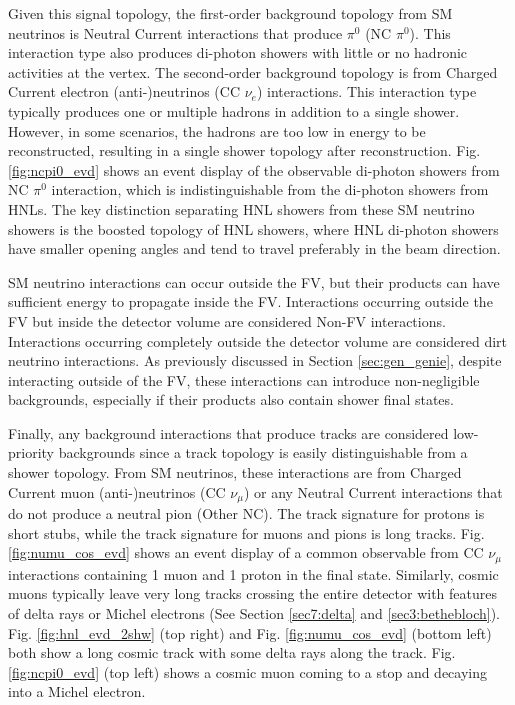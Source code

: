 Given this signal topology, the first-order background topology from SM neutrinos is Neutral Current interactions that produce $\pi^0$ (NC $\pi^0$).
This interaction type also produces di-photon showers with little or no hadronic activities at the vertex.
The second-order background topology is from Charged Current electron (anti-)neutrinos (CC $\nu_e$) interactions.
This interaction type typically produces one or multiple hadrons in addition to a single shower.
However, in some scenarios, the hadrons are too low in energy to be reconstructed, resulting in a single shower topology after reconstruction.
Fig. \ref{fig:ncpi0_evd} shows an event display of the observable di-photon showers from NC $\pi^0$ interaction, which is indistinguishable from the di-photon showers from HNLs.
The key distinction separating HNL showers from these SM neutrino showers is the boosted topology of HNL showers, where HNL di-photon showers have smaller opening angles and tend to travel preferably in the beam direction. 

SM neutrino interactions can occur outside the FV, but their products can have sufficient energy to propagate inside the FV.
Interactions occurring outside the FV but inside the detector volume are considered Non-FV interactions.
Interactions occurring completely outside the detector volume are considered dirt neutrino interactions.
As previously discussed in Section \ref{sec:gen_genie}, despite interacting outside of the FV, these interactions can introduce non-negligible backgrounds, especially if their products also contain shower final states. 

Finally, any background interactions that produce tracks are considered low-priority backgrounds since a track topology is easily distinguishable from a shower topology.
From SM neutrinos, these interactions are from Charged Current muon (anti-)neutrinos (CC $\nu_\mu$) or any Neutral Current interactions that do not produce a neutral pion (Other NC).
The track signature for protons is short stubs, while the track signature for muons and pions is long tracks.
Fig. \ref{fig:numu_cos_evd} shows an event display of a common observable from CC $\nu_\mu$ interactions containing 1 muon and 1 proton in the final state.
Similarly, cosmic muons typically leave very long tracks crossing the entire detector with features of delta rays or Michel electrons (See Section \ref{sec7:delta} and \ref{sec3:bethebloch}).
Fig. \ref{fig:hnl_evd_2shw} (top right) and Fig. \ref{fig:numu_cos_evd} (bottom left) both show a long cosmic track with some delta rays along the track.
Fig. \ref{fig:ncpi0_evd} (top left) shows a cosmic muon coming to a stop and decaying into a Michel electron.

